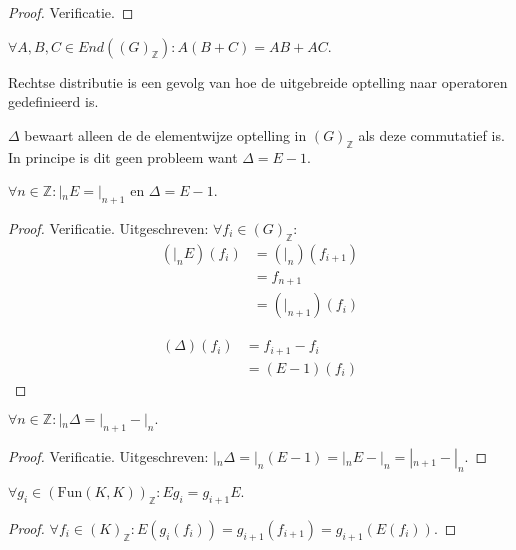 \documentclass[a4paper,12pt]{article}
\begin{document}
\begin{proof}
    Verificatie. %
\end{proof}

\begin{corollary}
    $\forall A,B,C \in End((G)_{\mathbb{Z}}): A(B+C)=AB + AC$.
\end{corollary}

\begin{remark}
    Rechtse distributie is een gevolg van hoe de uitgebreide optelling naar operatoren gedefinieerd is.
\end{remark}


\begin{remark}
    $\Delta$ bewaart alleen de de elementwijze optelling in $(G)_{\mathbb{Z}}$ als deze commutatief is.
    In principe is dit geen probleem want $\Delta = E-1$.
\end{remark}

\begin{lemma}
    $\forall n \in \mathbb{Z}:|_n E = |_{n+1}$ en $ \Delta = E-1$.
\end{lemma}

\begin{proof}
    Verificatie. Uitgeschreven: $\forall f_i \in (G)_{\mathbb{Z}}:$
    \begin{align*}
        (|_n E)(f_i) & = (|_n)(f_{i+1}) \\
                     & = f_{n+1}        \\
                     & = (|_{n+1})(f_i)
    \end{align*}

    \begin{align*}
        (\Delta)(f_i) & = f_{i+1} -f_i \\
                      & = (E-1)(f_i)
    \end{align*}
\end{proof}

\begin{corollary}
    $\forall n \in \mathbb{Z}:|_n \Delta = |_{n+1} - |_n.$
\end{corollary}

\begin{proof}
    Verificatie. Uitgeschreven: $ |_n \Delta = |_n (E-1) = |_n E - |_n = |_{n+1} - |_n.$
\end{proof}


\begin{theorem}
    $\forall g_i \in (\text{Fun}(K,K))_{\mathbb{Z}}: Eg_i = g_{i+1}E.$
\end{theorem}
\begin{proof}
    $\forall f_i \in (K)_{\mathbb{Z}}: E(g_i(f_i)) = g_{i+1}(f_{i+1}) = g_{i+1}(E(f_i)).$
\end{proof}
\end{document}
